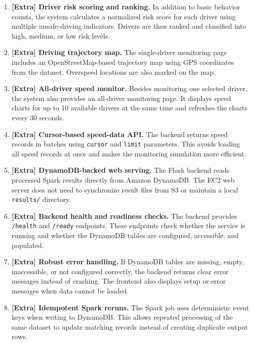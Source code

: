 \documentclass[12pt,a4paper]{article}
\begin{document}
\begin{enumerate}
    \item \textbf{[Extra] Driver risk scoring and ranking.}
    In addition to basic behavior counts, the system calculates a normalized risk score for each driver using multiple unsafe-driving indicators. Drivers are then ranked and classified into high, medium, or low risk levels.

    \item \textbf{[Extra] Driving trajectory map.}
    The single-driver monitoring page includes an OpenStreetMap-based trajectory map using GPS coordinates from the dataset. Overspeed locations are also marked on the map.

    \item \textbf{[Extra] All-driver speed monitor.}
    Besides monitoring one selected driver, the system also provides an all-driver monitoring page. It displays speed charts for up to 10 available drivers at the same time and refreshes the charts every 30 seconds.

    \item \textbf{[Extra] Cursor-based speed-data API.}
    The backend returns speed records in batches using \texttt{cursor} and \texttt{limit} parameters. This avoids loading all speed records at once and makes the monitoring simulation more efficient.

    \item \textbf{[Extra] DynamoDB-backed web serving.}
    The Flask backend reads processed Spark results directly from Amazon DynamoDB. The EC2 web server does not need to synchronize result files from S3 or maintain a local \texttt{results/} directory.

    \item \textbf{[Extra] Backend health and readiness checks.}
    The backend provides \texttt{/health} and \texttt{/ready} endpoints. These endpoints check whether the service is running and whether the DynamoDB tables are configured, accessible, and populated.

    \item \textbf{[Extra] Robust error handling.}
    If DynamoDB tables are missing, empty, inaccessible, or not configured correctly, the backend returns clear error messages instead of crashing. The frontend also displays setup or error messages when data cannot be loaded.

    \item \textbf{[Extra] Idempotent Spark reruns.}
    The Spark job uses deterministic event keys when writing to DynamoDB. This allows repeated processing of the same dataset to update matching records instead of creating duplicate output rows.


\end{enumerate}
\end{document}
